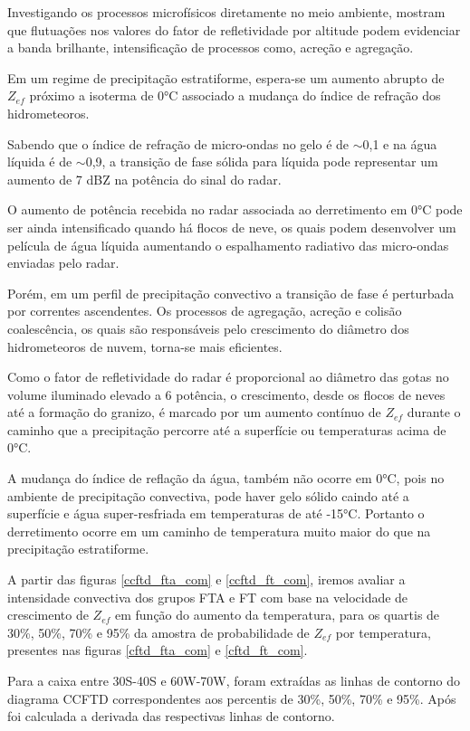 \documentclass[preprint,authoryear,3p]{elsarticle}
\begin{document}
\begin{multicols}{2}
Investigando os processos microfísicos diretamente no meio ambiente, \cite{Fabry1995} mostram que flutuações nos valores do fator de refletividade por altitude podem evidenciar a banda brilhante, intensificação de processos como, acreção e agregação.

Em um regime de precipitação estratiforme, espera-se um aumento abrupto de $Z_{ef}$ próximo a isoterma de 0°C associado a mudança do índice de refração dos hidrometeoros. 

Sabendo que o índice de refração de micro-ondas no gelo é de $\sim$0,1 e na água líquida é de $\sim$0,9, a transição de fase sólida para líquida pode representar um aumento de 7 dBZ na potência do sinal do radar. 

O aumento de potência recebida no radar associada ao derretimento em 0°C pode ser ainda intensificado quando há flocos de neve, os quais podem desenvolver um película de água líquida aumentando o espalhamento radiativo das micro-ondas enviadas pelo radar.

Porém, em um perfil de precipitação convectivo a transição de fase é perturbada por correntes ascendentes. Os processos de agregação, acreção e colisão coalescência, os quais são responsáveis pelo crescimento do diâmetro dos hidrometeoros de nuvem, torna-se mais eficientes. 

Como o fator de refletividade do radar é proporcional ao diâmetro das gotas no volume iluminado elevado a 6 potência, o crescimento, desde os flocos de neves até a formação do granizo, é marcado por um aumento contínuo de $Z_{ef}$ durante o caminho que a precipitação percorre até a superfície ou temperaturas acima de 0°C.

A mudança do índice de reflação da água, também não ocorre em 0°C, pois no ambiente de precipitação convectiva, pode haver gelo sólido caindo até a superfície e água super-resfriada em temperaturas de até -15°C. Portanto o derretimento ocorre em um caminho de temperatura muito maior do que na precipitação estratiforme.

A partir das figuras \ref{ccftd_fta_com} e \ref{ccftd_ft_com}, iremos avaliar a intensidade convectiva dos grupos FTA e FT com base na velocidade de crescimento de $Z_{ef}$ em função do aumento da temperatura, para os quartis de 30\%, 50\%, 70\% e 95\% da amostra de probabilidade de $Z_{ef}$ por temperatura, presentes nas figuras \ref{cftd_fta_com} e \ref{cftd_ft_com}.

Para a caixa entre 30S-40S e 60W-70W, foram extraídas as linhas de contorno do diagrama CCFTD correspondentes aos percentis de 30\%, 50\%, 70\% e 95\%. Após foi calculada a derivada das respectivas linhas de contorno.


\end{multicols}
\end{document}
